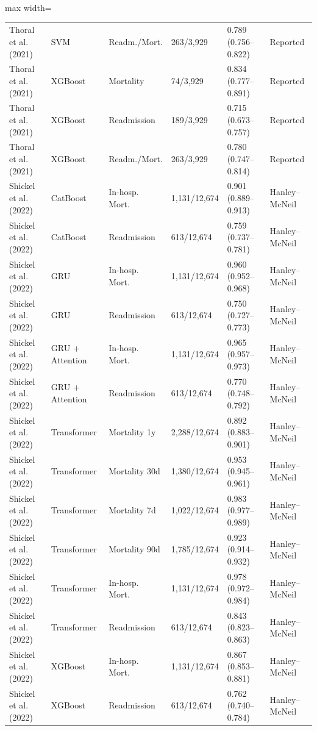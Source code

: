 \begin{table}[H]
\begin{adjustbox}{max width=\textwidth}
\begin{tabular}{llllll}
    Thoral et al. (2021) & SVM & Readm./Mort. & 263/3,929 & 0.789 (0.756--0.822) & Reported \\
    Thoral et al. (2021) & XGBoost & Mortality & 74/3,929 & 0.834 (0.777--0.891) & Reported \\
    Thoral et al. (2021) & XGBoost & Readmission & 189/3,929 & 0.715 (0.673--0.757) & Reported \\
    Thoral et al. (2021) & XGBoost & Readm./Mort. & 263/3,929 & 0.780 (0.747--0.814) & Reported \\
    Shickel et al. (2022) & CatBoost & In-hosp. Mort. & 1,131/12,674 & 0.901 (0.889--0.913) & Hanley--McNeil \\
    Shickel et al. (2022) & CatBoost & Readmission & 613/12,674 & 0.759 (0.737--0.781) & Hanley--McNeil \\
    Shickel et al. (2022) & GRU & In-hosp. Mort. & 1,131/12,674 & 0.960 (0.952--0.968) & Hanley--McNeil \\
    Shickel et al. (2022) & GRU & Readmission & 613/12,674 & 0.750 (0.727--0.773) & Hanley--McNeil \\
    Shickel et al. (2022) & GRU + Attention & In-hosp. Mort. & 1,131/12,674 & 0.965 (0.957--0.973) & Hanley--McNeil \\
    Shickel et al. (2022) & GRU + Attention & Readmission & 613/12,674 & 0.770 (0.748--0.792) & Hanley--McNeil \\
    Shickel et al. (2022) & Transformer & Mortality 1y & 2,288/12,674 & 0.892 (0.883--0.901) & Hanley--McNeil \\
    Shickel et al. (2022) & Transformer & Mortality 30d & 1,380/12,674 & 0.953 (0.945--0.961) & Hanley--McNeil \\
    Shickel et al. (2022) & Transformer & Mortality 7d & 1,022/12,674 & 0.983 (0.977--0.989) & Hanley--McNeil \\
    Shickel et al. (2022) & Transformer & Mortality 90d & 1,785/12,674 & 0.923 (0.914--0.932) & Hanley--McNeil \\
    Shickel et al. (2022) & Transformer & In-hosp. Mort. & 1,131/12,674 & 0.978 (0.972--0.984) & Hanley--McNeil \\
    Shickel et al. (2022) & Transformer & Readmission & 613/12,674 & 0.843 (0.823--0.863) & Hanley--McNeil \\
    Shickel et al. (2022) & XGBoost & In-hosp. Mort. & 1,131/12,674 & 0.867 (0.853--0.881) & Hanley--McNeil \\
    Shickel et al. (2022) & XGBoost & Readmission & 613/12,674 & 0.762 (0.740--0.784) & Hanley--McNeil \\

\end{tabular}
\end{adjustbox}
\end{table}
